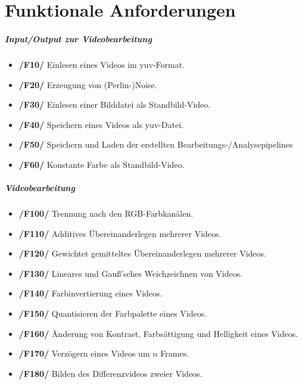 \section{Funktionale Anforderungen}

\subparagraph{Input/Output zur Videobearbeitung} 
\begin{itemize} 
	\item \textbf{/F10/} Einlesen eines Videos im yuv-Format.
	\item \textbf{/F20/} Erzeugung von (Perlin-)Noise.
	\item \textbf{/F30/} Einlesen einer Bilddatei als Standbild-Video.
	\item \textbf{/F40/} Speichern eines Videos als yuv-Datei.
	\item \textbf{/F50/} Speichern und Laden der erstellten Bearbeitungs-/Analysepipelines
	\item \textbf{/F60/} Konstante Farbe als Standbild-Video.
\end{itemize}

\subparagraph{Videobearbeitung}
\begin{itemize}
	\item \textbf{/F100/} Trennung nach den RGB-Farbkanälen.
	\item \textbf{/F110/} Additives Übereinanderlegen mehrerer Videos.
	\item \textbf{/F120/} Gewichtet gemitteltes Übereinanderlegen mehrerer Videos.
	\item \textbf{/F130/} Lineares und Gauß'sches Weichzeichnen von Videos.
	\item \textbf{/F140/} Farbinvertierung eines Videos.
	\item \textbf{/F150/} Quantisieren der Farbpalette eines Videos.
	\item \textbf{/F160/} Änderung von Kontrast, Farbsättigung und Helligkeit eines Videos.
	\item \textbf{/F170/} Verzögern eines Videos um $n$ Frames.	
	\item \textbf{/F180/} Bilden des Differenzvideos zweier Videos.
\end{itemize}

